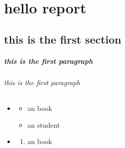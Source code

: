 \documentclass{report}
\begin{document}
\chapter{hello report}
\section{this is the first section}
\paragraph{this is the first paragraph}
\subparagraph{this is the first paragraph}

\begin{itemize}
    \item   
    \begin{itemize}
            \item an book
            \item an student
    \end{itemize}    
    \item  
    \begin{enumerate}
        \item an book
    \end{enumerate}
\end{itemize}   
\end{document}
